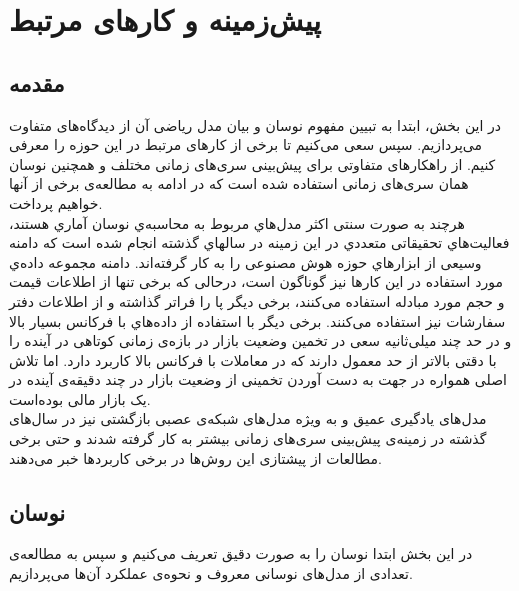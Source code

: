 \chapter{پیش‌زمینه و کارهای مرتبط‌}
\section{مقدمه}
در این بخش، ابتدا به تبیین مفهوم نوسان و بیان مدل ریاضی آن از دیدگاه‌های متفاوت می‌پردازیم. سپس سعی می‌کنیم تا برخی از کارهای مرتبط در این حوزه را معرفی کنیم. از راهکارهای متفاوتی برای پیش‌بینی‌ سری‌های زمانی مختلف و همچنین نوسان همان سری‌های زمانی استفاده شده است که در ادامه به مطالعه‌ی برخی از ‌آنها خواهیم پرداخت.\\
هرچند به صورت سنتی اکثر مدل‌هاي مربوط به محاسبه‌ي نوسان آماري هستند، فعالیت‌هاي تحقیقاتی متعددي در این زمینه در سالهاي گذشته انجام شده است که دامنه وسیعی از ابزارهاي حوزه هوش مصنوعی را به کار گرفته‌اند. دامنه مجموعه داده‌ي مورد استفاده در این کارها نیز گوناگون است، درحالی که برخی تنها از اطلاعات قیمت و حجم مورد مبادله استفاده می‌کنند، برخی دیگر پا را فراتر گذاشته و از اطلاعات دفتر سفارشات نیز استفاده می‌کنند. برخی دیگر با استفاده از داده‌هاي با فرکانس بسیار بالا و در حد چند میلی‌ثانیه سعی در تخمین وضعیت بازار در بازه‌ی زمانی کوتاهی در آینده را با دقتی بالاتر از حد معمول دارند که در معاملات با فرکانس بالا کاربرد دارد. اما تلاش اصلی همواره در جهت به دست آوردن تخمینی از وضعیت بازار در چند دقیقه‌ی آینده در یک بازار مالی بوده‌است.\\
مدل‌های یادگیری عمیق و به ویژه مدل‌های شبکه‌ی عصبی بازگشتی نیز در سال‌های گذشته در زمینه‌ی پیش‌بینی سری‌های زمانی بیشتر به کار گرفته شدند و حتی برخی مطالعات از پیشتازی این روش‌ها در برخی کاربردها خبر می‌دهند.

\section{نوسان} 
در این بخش ابتدا نوسان را به صورت دقیق تعریف می‌کنیم و سپس به مطالعه‌ی تعدادی از مدل‌های نوسانی معروف و نحوه‌ی عملکرد آن‌ها می‌پردازیم.

